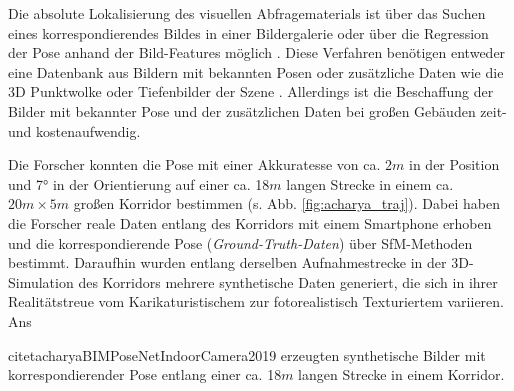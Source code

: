 Die absolute Lokalisierung des visuellen Abfragematerials ist über das Suchen eines korrespondierendes Bildes in einer Bildergalerie oder über die Regression der Pose anhand der Bild-Features möglich \cite{piascoSurveyVisualBasedLocalization2018}. Diese Verfahren benötigen entweder eine Datenbank aus Bildern mit bekannten Posen \cite{zhangImageBasedLocalization2006, arandjelovicThreeThingsEveryone2012, radenovicCNNImageRetrieval2016} oder zusätzliche Daten wie die 3D Punktwolke \cite{irscharaStructurefrommotionPointClouds2009, liWorldwidePoseEstimation2012, svarmCityScaleLocalizationCameras2017} oder Tiefenbilder der Szene \cite{shottonSceneCoordinateRegression2013a}. Allerdings ist die Beschaffung der Bilder mit bekannter Pose und der zusätzlichen Daten bei großen Gebäuden zeit- und kostenaufwendig.




Die Forscher \citet{acharyaBIMPoseNetIndoorCamera2019} konnten die Pose mit einer Akkuratesse von ca. $2m$ in der Position und 7° in der Orientierung auf einer ca. 18$m$ langen Strecke in einem ca. $20m \times 5m$ großen Korridor bestimmen (s. Abb. \ref{fig:acharya_traj}). Dabei haben die Forscher reale Daten entlang des Korridors mit einem Smartphone erhoben und die korrespondierende Pose (\textit{Ground-Truth-Daten}) über SfM-Methoden bestimmt. Daraufhin wurden entlang derselben Aufnahmestrecke in der 3D-Simulation des Korridors mehrere synthetische Daten generiert, die sich in ihrer Realitätstreue vom Karikaturistischem zur fotorealistisch Texturiertem variieren. Ans

citet{acharyaBIMPoseNetIndoorCamera2019} erzeugten synthetische Bilder mit korrespondierender Pose entlang einer ca. 18$m$ langen Strecke in einem Korridor.



